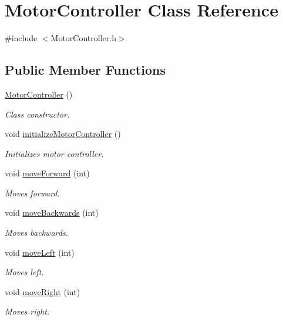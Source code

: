 \hypertarget{classMotorController}{\section{Motor\-Controller Class Reference}
\label{classMotorController}
}


{\ttfamily \#include $<$Motor\-Controller.\-h$>$}

\subsection*{Public Member Functions}
\begin{DoxyCompactItemize}
\item 
\hyperlink{classMotorController_a1c32db157ba4b6dba1f2d6bc8891f16d}{Motor\-Controller} ()
\begin{DoxyCompactList}\small\item\em Class constructor. \end{DoxyCompactList}\item 
void \hyperlink{classMotorController_a56ae5e4c44399b8afe94eb721514dd5e}{initialize\-Motor\-Controller} ()
\begin{DoxyCompactList}\small\item\em Initializes motor controller. \end{DoxyCompactList}\item 
void \hyperlink{classMotorController_ab0dffd70556dbab55aa990673e6dc5f8}{move\-Forward} (int)
\begin{DoxyCompactList}\small\item\em Moves forward. \end{DoxyCompactList}\item 
void \hyperlink{classMotorController_a3ad21d7cff7b0c3c6700b2755b1df2d2}{move\-Backwards} (int)
\begin{DoxyCompactList}\small\item\em Moves backwards. \end{DoxyCompactList}\item 
void \hyperlink{classMotorController_a4c3beafe5316cd08fd44845e20ec7151}{move\-Left} (int)
\begin{DoxyCompactList}\small\item\em Moves left. \end{DoxyCompactList}\item 
void \hyperlink{classMotorController_aa1586060f2ee0f66e83d30c897a1cdb4}{move\-Right} (int)
\begin{DoxyCompactList}\small\item\em Moves right. \end{DoxyCompactList}\end{DoxyCompactItemize}


